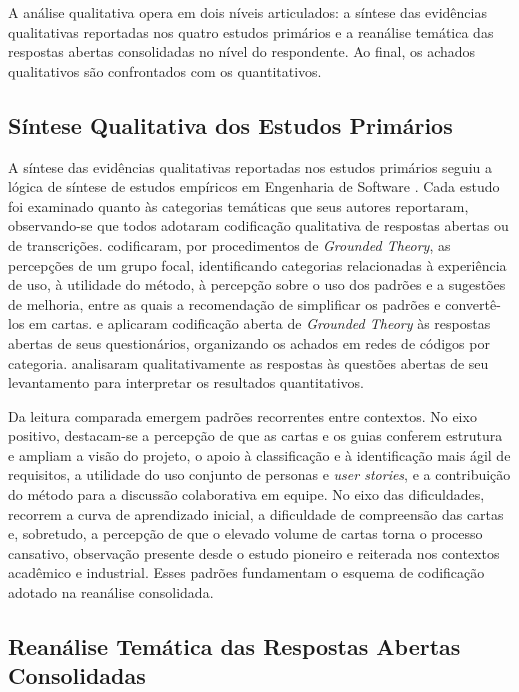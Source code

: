 A análise qualitativa opera em dois níveis articulados: a síntese das evidências qualitativas reportadas nos quatro estudos primários e a reanálise temática das respostas abertas consolidadas no nível do respondente. Ao final, os achados qualitativos são confrontados com os quantitativos.

\subsection{Síntese Qualitativa dos Estudos Primários}
\label{sec:sintese-qualitativa-primarios}

A síntese das evidências qualitativas reportadas nos estudos primários seguiu a lógica de síntese de estudos empíricos em Engenharia de Software \cite{kitchenham2009,cruzesdyba2010}. Cada estudo foi examinado quanto às categorias temáticas que seus autores reportaram, observando-se que todos adotaram codificação qualitativa de respostas abertas ou de transcrições.  codificaram, por procedimentos de \textit{Grounded Theory}, as percepções de um grupo focal, identificando categorias relacionadas à experiência de uso, à utilidade do método, à percepção sobre o uso dos padrões e a sugestões de melhoria, entre as quais a recomendação de simplificar os padrões e convertê-los em cartas.  e  aplicaram codificação aberta de \textit{Grounded Theory} às respostas abertas de seus questionários, organizando os achados em redes de códigos por categoria.  analisaram qualitativamente as respostas às questões abertas de seu levantamento para interpretar os resultados quantitativos.

Da leitura comparada emergem padrões recorrentes entre contextos. No eixo positivo, destacam-se a percepção de que as cartas e os guias conferem estrutura e ampliam a visão do projeto, o apoio à classificação e à identificação mais ágil de requisitos, a utilidade do uso conjunto de personas e \textit{user stories}, e a contribuição do método para a discussão colaborativa em equipe. No eixo das dificuldades, recorrem a curva de aprendizado inicial, a dificuldade de compreensão das cartas e, sobretudo, a percepção de que o elevado volume de cartas torna o processo cansativo, observação presente desde o estudo pioneiro e reiterada nos contextos acadêmico e industrial. Esses padrões fundamentam o esquema de codificação adotado na reanálise consolidada.

\subsection{Reanálise Temática das Respostas Abertas Consolidadas}
\label{sec:reanalise-tematica}

